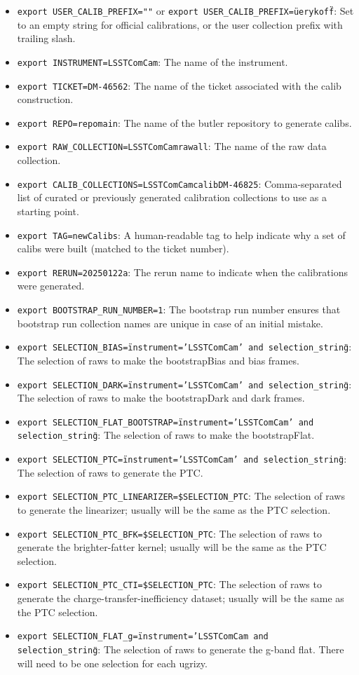 \documentclass[DM,authoryear,toc]{lsstdoc}
\begin{document}
\begin{itemize}
\item{\texttt{export USER\_CALIB\_PREFIX=""} or \texttt{export USER\_CALIB\_PREFIX=\"u\/erykoff\"}: Set to an empty string for official calibrations, or the user collection prefix with trailing slash.}
\item{\texttt{export INSTRUMENT=LSSTComCam}: The name of the instrument.}
\item{\texttt{export TICKET=DM-46562}: The name of the ticket associated with the calib construction.}
\item{\texttt{export REPO=\/repo\/main}: The name of the butler repository to generate calibs.}
\item{\texttt{export RAW\_COLLECTION=LSSTComCam\/raw\/all}: The name of the raw data collection.}
\item{\texttt{export CALIB\_COLLECTIONS=LSSTComCam\/calib\/DM-46825}: Comma-separated list of curated or previously generated calibration collections to use as a starting point.}
\item{\texttt{export TAG=newCalibs}: A human-readable tag to help indicate why a set of calibs were built (matched to the ticket number).}
\item{\texttt{export RERUN=20250122a}: The rerun name to indicate when the calibrations were generated.}
\item{\texttt{export BOOTSTRAP\_RUN\_NUMBER=1}: The bootstrap run number ensures that bootstrap run collection names are unique in case of an initial mistake.}
\item{\texttt{export SELECTION\_BIAS=\"instrument='LSSTComCam' and selection\_string\"}: The selection of raws to make the bootstrapBias and bias frames.}
\item{\texttt{export SELECTION\_DARK=\"instrument='LSSTComCam' and selection\_string\"}: The selection of raws to make the bootstrapDark and dark frames.}
\item{\texttt{export SELECTION\_FLAT\_BOOTSTRAP=\"instrument='LSSTComCam' and selection\_string\"}: The selection of raws to make the bootstrapFlat.}
\item{\texttt{export SELECTION\_PTC=\"instrument='LSSTComCam' and selection\_string\"}: The selection of raws to generate the PTC.}
\item{\texttt{export SELECTION\_PTC\_LINEARIZER=\$SELECTION\_PTC}: The selection of raws to generate the linearizer; usually will be the same as the PTC selection.}
\item{\texttt{export SELECTION\_PTC\_BFK=\$SELECTION\_PTC}: The selection of raws to generate the brighter-fatter kernel; usually will be the same as the PTC selection.}
\item{\texttt{export SELECTION\_PTC\_CTI=\$SELECTION\_PTC}: The selection of raws to generate the charge-transfer-inefficiency dataset; usually will be the same as the PTC selection.}
\item{\texttt{export SELECTION\_FLAT\_g=\"instrument='LSSTComCam and selection\_string\"}: The selection of raws to generate the g-band flat. There will need to be one selection for each ugrizy.}
\end{itemize}
\end{document}
